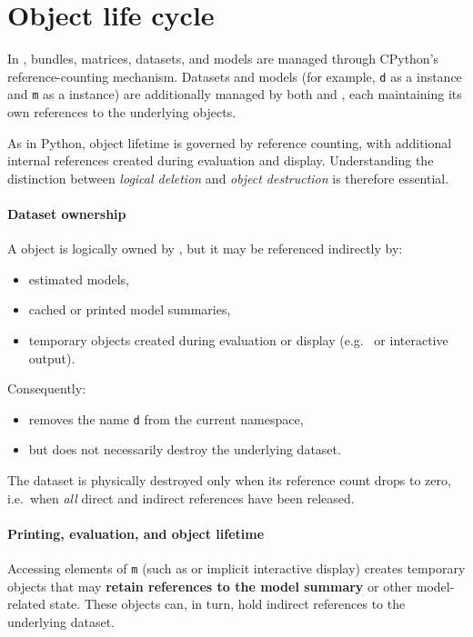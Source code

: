 \section{Object life cycle}
In \gretlpy, bundles, matrices, datasets, and models are
managed through CPython's reference-counting mechanism.
Datasets and models (for example, \texttt{d} as a
\classpydatasetnosp instance and \texttt{m} as a
\classpymodelnosp instance) are additionally managed by both
\python and \lgretl, each maintaining its own references to
the underlying objects.

As in Python, object lifetime is governed by reference
counting, with additional internal references created during
evaluation and display. Understanding the distinction between
\emph{logical deletion} and \emph{object destruction} is
therefore essential.

\paragraph{Dataset ownership}
A \classpydatasetnosp object is logically owned by \python, but it may be
referenced indirectly by:
\begin{itemize}
	\item estimated models,
	\item cached or printed model summaries,
	\item temporary \python objects created during evaluation
		or display (e.g.\  or interactive output).
\end{itemize}

Consequently:
\begin{itemize}
	\item {} removes the name \texttt{d} from
		the current \python namespace,
	\item but does not necessarily destroy the underlying dataset.
\end{itemize}
The dataset is physically destroyed only when its reference count
drops to zero, i.e.\ when \emph{all} direct and indirect references
have been released.

\paragraph{Printing, evaluation, and object lifetime}
Accessing elements of \texttt{m} (such as  or
implicit interactive display) creates temporary \python objects that
may \textbf{retain references to the model summary} or other
model-related state. These objects can, in turn, hold indirect
references to the underlying dataset.

